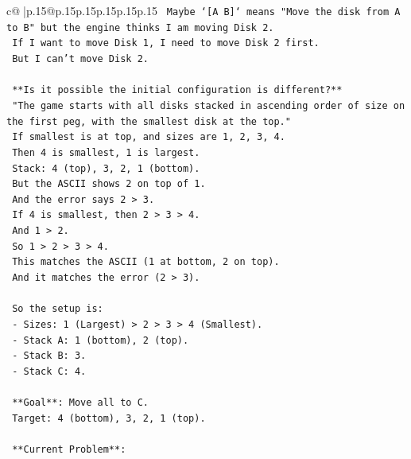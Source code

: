\documentclass{article}
\begin{document}
{\begin{supertabular}{c@{$\;$}|p{.15\linewidth}@{}p{.15\linewidth}p{.15\linewidth}p{.15\linewidth}p{.15\linewidth}p{.15\linewidth}}
{{{\texttt{                Maybe `{[}A B{]}` means "Move the disk from A to B" but the engine thinks I am moving Disk 2.} \\
\texttt{                If I want to move Disk 1, I need to move Disk 2 first.} \\
\texttt{                But I can't move Disk 2.} \\
\\ 
\texttt{                **Is it possible the initial configuration is different?**} \\
\texttt{                "The game starts with all disks stacked in ascending order of size on the first peg, with the smallest disk at the top."} \\
\texttt{                If smallest is at top, and sizes are 1, 2, 3, 4.} \\
\texttt{                Then 4 is smallest, 1 is largest.} \\
\texttt{                Stack: 4 (top), 3, 2, 1 (bottom).} \\
\texttt{                But the ASCII shows 2 on top of 1.} \\
\texttt{                And the error says 2 > 3.} \\
\texttt{                If 4 is smallest, then 2 > 3 > 4.} \\
\texttt{                And 1 > 2.} \\
\texttt{                So 1 > 2 > 3 > 4.} \\
\texttt{                This matches the ASCII (1 at bottom, 2 on top).} \\
\texttt{                And it matches the error (2 > 3).} \\
\\ 
\texttt{                So the setup is:} \\
\texttt{                {-} Sizes: 1 (Largest) > 2 > 3 > 4 (Smallest).} \\
\texttt{                {-} Stack A: 1 (bottom), 2 (top).} \\
\texttt{                {-} Stack B: 3.} \\
\texttt{                {-} Stack C: 4.} \\
\\ 
\texttt{                **Goal**: Move all to C.} \\
\texttt{                Target: 4 (bottom), 3, 2, 1 (top).} \\
\\ 
\texttt{                **Current Problem**:} \\
}}}
\end{supertabular}}
\end{document}
